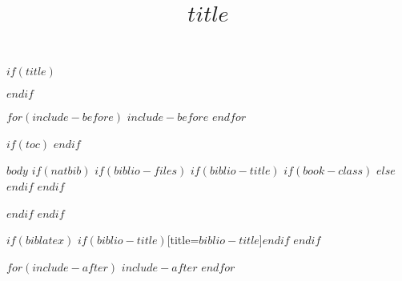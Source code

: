 \documentclass[
  $if(fontsize)$
    $fontsize$,
  $endif$
  $if(papersize)$
    $papersize$paper,
  $else$
    paper=a4,
  $endif$
  $if(lang)$
    $lang$
  $endif$
]{$documentclass$}
\title{$title$}
\begin{document}
$if(title)$
\maketitle
$endif$

$for(include-before)$
$include-before$
$endfor$

$if(toc)${
  \renewcommand*\contentsname{Table of Contents}
  \hypersetup{linkcolor=black}
  \setcounter{tocdepth}{$toc-depth$}
  \tableofcontents
  \clearpage  %
  \setcounter{page}{1}
}
$endif$
\newpage

$body$
$if(natbib)$
$if(biblio-files)$
$if(biblio-title)$
$if(book-class)$
\renewcommand\bibname{$biblio-title$}
$else$
\renewcommand\refname{$biblio-title$}
$endif$
$endif$

$endif$
$endif$

$if(biblatex)$
\printbibliography$if(biblio-title)$[title=$biblio-title$]$endif$
$endif$

$for(include-after)$
$include-after$
$endfor$
\end{document}
